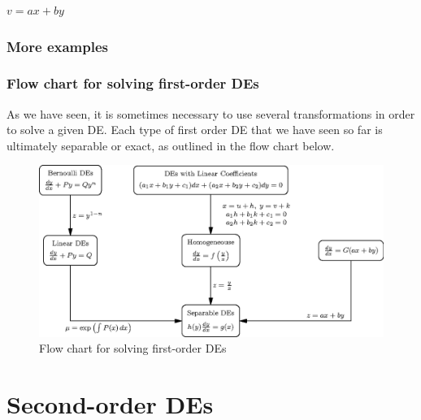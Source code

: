 \documentclass{book}
\begin{document}

$v = ax + by$


\newpage
\subsection{More examples}








\newpage
\subsection{Flow chart for solving first-order DEs}

As we have seen, it is sometimes necessary to use several
transformations in order to solve a given DE.  Each type of first
order DE that we have seen so far is ultimately separable or exact, as
outlined in the flow chart below.

\vspace{0.5in}
\begin{figure}[h]
  \centering
  \includegraphics{201/firstorderchart}
  \caption{Flow chart for solving first-order DEs}
  \label{fig:first_order_flow_shar}
\end{figure}


\newpage
\chapter{Second-order DEs}
\end{document}
